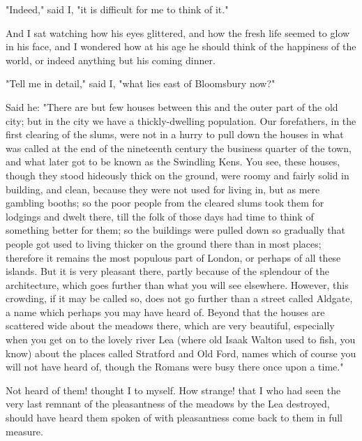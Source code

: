 "Indeed," said I, "it is difficult for me to think of it."

And I sat watching how his eyes glittered, and how the fresh life seemed
to glow in his face, and I wondered how at his age he should think of
the happiness of the world, or indeed anything but his coming dinner.

"Tell me in detail," said I, "what lies east of Bloomsbury now?"

Said he: "There are but few houses between this and the outer part of
the old city; but in the city we have a thickly-dwelling population. Our
forefathers, in the first clearing of the slums, were not in a hurry to
pull down the houses in what was called at the end of the nineteenth
century the business quarter of the town, and what later got to be known
as the Swindling Kens. You see, these houses, though they stood
hideously thick on the ground, were roomy and fairly solid in building,
and clean, because they were not used for living in, but as mere
gambling booths; so the poor people from the cleared slums took them for
lodgings and dwelt there, till the folk of those days had time to think
of something better for them; so the buildings were pulled down so
gradually that people got used to living thicker on the ground there
than in most places; therefore it remains the most populous part of
London, or perhaps of all these islands. But it is very pleasant there,
partly because of the splendour of the architecture, which goes further
than what you will see elsewhere. However, this crowding, if it may be
called so, does not go further than a street called Aldgate, a name
which perhaps you may have heard of. Beyond that the houses are
scattered wide about the meadows there, which are very beautiful,
especially when you get on to the lovely river Lea (where old Isaak
Walton used to fish, you know) about the places called Stratford and Old
Ford, names which of course you will not have heard of, though the
Romans were busy there once upon a time."

Not heard of them! thought I to myself. How strange! that I who had seen
the very last remnant of the pleasantness of the meadows by the Lea
destroyed, should have heard them spoken of with pleasantness come back
to them in full measure.


